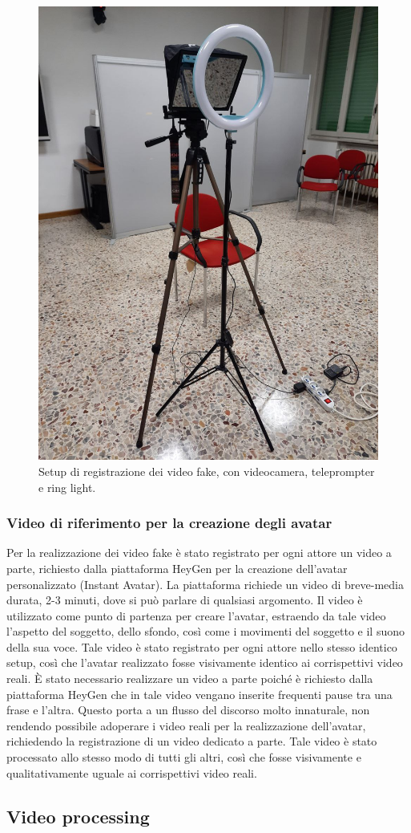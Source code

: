 \begin{figure}[t]
    \centering
    \includegraphics[width=0.4\linewidth]{images/recording_setup}
    \caption{Setup di registrazione dei video fake, con videocamera, teleprompter e ring light.}
    \label{fig:recording_setup}
\end{figure}

\subsubsection{Video di riferimento per la creazione degli avatar}

Per la realizzazione dei video fake è stato registrato per ogni attore un video a parte, richiesto dalla piattaforma HeyGen per la creazione dell'avatar personalizzato (Instant Avatar). La piattaforma richiede un video di breve-media durata, 2-3 minuti, dove si può parlare di qualsiasi argomento. Il video è utilizzato come punto di partenza per creare l'avatar, estraendo da tale video l'aspetto del soggetto, dello sfondo, così come i movimenti del soggetto e il suono della sua voce. Tale video è stato registrato per ogni attore nello stesso identico setup, così che l'avatar realizzato fosse visivamente identico ai corrispettivi video reali. È stato necessario realizzare un video a parte poiché è richiesto dalla piattaforma HeyGen che in tale video vengano inserite frequenti pause tra una frase e l'altra. Questo porta a un flusso del discorso molto innaturale, non rendendo possibile adoperare i video reali per la realizzazione dell'avatar, richiedendo la registrazione di un video dedicato a parte. Tale video è stato processato allo stesso modo di tutti gli altri, così che fosse visivamente e qualitativamente uguale ai corrispettivi video reali.

\subsection{Video processing}


